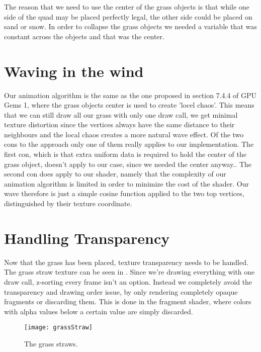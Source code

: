 The reason that we need to use the center of the grass objects is that
while one side of the quad may be placed perfectly legal, the other
side could be placed on sand or snow. In order to collapse the grass
objects we needed a variable that was constant across the objects and
that was the center.


\section{Waving in the wind}

Our animation algorithm is the same as the one proposed in section
7.4.4 of GPU Gems 1, where the grass objects center is used to create
'locel chaos'. This means that we can still draw all our grass with
only one draw call, we get minimal texture distortion since the
vertices always have the same distance to their neighbours and the
local chaos creates a more natural wave effect. Of the two cons to the
approach only one of them really applies to our implementation. The
first con, which is that extra uniform data is required to hold the
center of the grass object, doesn't apply to our case, since we needed
the center anyway.. The second con does apply to our shader, namely
that the complexity of our animation algorithm is limited in order to
minimize the cost of the shader. Our wave therefore is just a simple
cosine function applied to the two top vertices, distinguished by
their texture coordinate.


\section{Handling Transparency}\label{sec:transparency}


Now that the grass has been placed, texture transparency needs to be
handled. The grass straw texture can be seen in
. Since we're drawing everything with one draw
call, z-sorting every frame isn't an option. Instead we completely
avoid the transparency and drawing order issue, by only rendering
completely opaque fragments or discarding them. This is done in the
fragment shader, where colors with alpha values below a certain value
are simply discarded.

\begin{figure}
  \label{fig:grassStraws}
  \centering
  \texttt{[image: grassStraw]}
  \caption{The grass straws.}
\end{figure}









